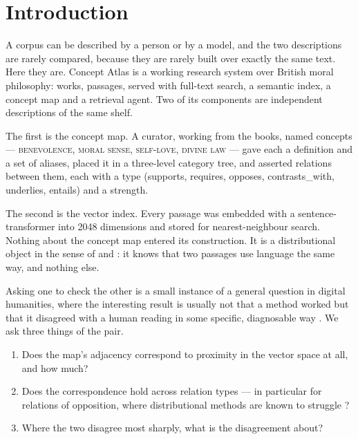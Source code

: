 \documentclass[11pt,a4paper]{article}
\newcommand{\concept}[1]{\textsc{#1}}
\newcommand{\rel}[1]{\textsf{#1}}
\begin{document}
\section{Introduction}

A corpus can be described by a person or by a model, and the two descriptions
are rarely compared, because they are rarely built over exactly the same text.
Here they are. Concept Atlas is a working research system over British moral
philosophy: \NBooks{} works, \NPassages{} passages, served with full-text
search, a semantic index, a concept map and a retrieval agent. Two of its
components are independent descriptions of the same shelf.

The first is the concept map. A curator, working from the books, named
\NConcepts{} concepts --- \concept{benevolence}, \concept{moral sense},
\concept{self-love}, \concept{divine law} --- gave each a definition and a set
of aliases, placed it in a three-level category tree, and asserted
\NAssertions{} relations between them, each with a type
(\rel{supports}, \rel{requires}, \rel{opposes}, \rel{contrasts\_with},
\rel{underlies}, \rel{entails}) and a strength.

The second is the vector index. Every passage was embedded with a
sentence-transformer into 2048 dimensions and stored for nearest-neighbour
search. Nothing about the concept map entered its construction. It is a
distributional object in the sense of \citet{harris1954} and
\citet{firth1957}: it knows that two passages use language the same way, and
nothing else.

Asking one to check the other is a small instance of a general question in
digital humanities, where the interesting result is usually not that a method
worked but that it disagreed with a human reading in some specific,
diagnosable way \citep{underwood2019}. We ask three things of the pair.

\begin{enumerate}
\item Does the map's adjacency correspond to proximity in the vector space
      at all, and how much?
\item Does the correspondence hold across relation types --- in particular for
      relations of opposition, where distributional methods are known to
      struggle \citep{mohammad2013,nguyen2016}?
\item Where the two disagree most sharply, what is the disagreement about?
\end{enumerate}
\end{document}
